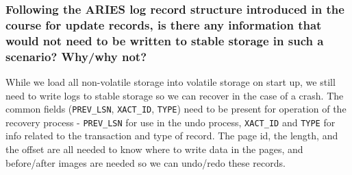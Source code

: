 \documentclass{article}
\begin{document}
\subsubsection{Following the ARIES log record structure introduced in the course for update records, is there any information that would not need to be written to stable storage in such a scenario? Why/why not?}

While we load all non-volatile storage into volatile storage on start up, we still need to write logs to stable storage so we can recover in the case of a crash. The common fields (\verb|PREV_LSN|, \verb|XACT_ID|, \verb|TYPE|) need to be present for operation of the recovery process - \verb|PREV_LSN| for use in the undo process, \verb|XACT_ID| and \verb|TYPE| for info related to the transaction and type of record. The page id, the length, and the offset are all needed to know where to write data in the pages, and before/after images are needed so we can undo/redo these records.
\end{document}
